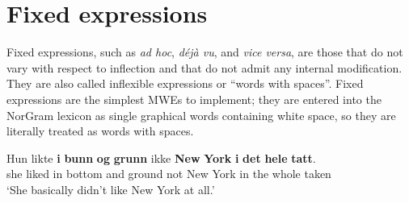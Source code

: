 \documentclass[output=paper]{langsci/langscibook}
\begin{document}
%
%
%
 
 \section{Fixed expressions}\label{dyv:sec:mweiness:fixed}

Fixed expressions, such as \textit{ad hoc}, \textit{déjà vu}, and \textit{vice versa}, are those that do not vary with respect to inflection and that do not admit any internal modification.
They are also called inflexible expressions or ``words with spaces''.
Fixed expressions are the simplest MWEs to implement; they are entered into the NorGram lexicon as single graphical words containing white space, so they are literally treated as words with spaces.

\ea\label{dyv:ex:mweiness:wws}
\gll Hun likte \textbf{i} \textbf{bunn} \textbf{og} \textbf{grunn} ikke \textbf{New} \textbf{York} \textbf{i} \textbf{det} \textbf{hele} \textbf{tatt}. \\
     she liked in bottom and ground not New York in the whole taken\\
\glt `She basically didn’t like New York at all.’
\z
\end{document}
